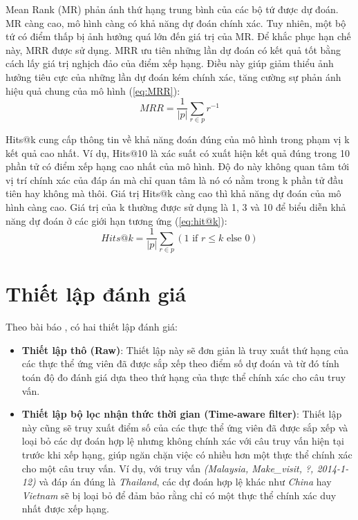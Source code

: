 Mean Rank (MR) phản ánh thứ hạng trung bình của các bộ tứ được dự đoán. MR càng cao, mô hình càng có khả năng dự đoán chính xác. Tuy
nhiên, một bộ tứ có điểm thấp bị ảnh hưởng quá lớn đến giá trị của MR. Để khắc phục hạn chế này, MRR được sử dụng. MRR ưu tiên những lần 
dự đoán có kết quả tốt bằng cách lấy giá trị nghịch đảo của điểm xếp hạng. Điều này giúp giảm thiểu ảnh hưởng tiêu cực của những lần dự đoán kém 
chính xác, tăng cường sự phản ánh hiệu quả chung của mô hình (\ref{eq:MRR}):
\begin{equation}
    \label{eq:MRR}
    MRR = \frac{1}{|p|} \sum_{r \in p} r^{-1}
\end{equation}

Hits@k cung cấp thông tin về khả năng đoán đúng của mô hình trong phạm vị k kết quả cao nhất. Ví dụ, Hits@10 là xác suất có xuất hiện kết quả đúng trong 10 phần tử có điểm xếp hạng cao nhất của mô hình. Độ đo này không quan tâm tới vị trí chính xác của đáp án mà chỉ quan tâm là nó có nằm trong k phần tử đầu tiên hay không mà thôi. Giá trị Hits@k càng cao thì khả năng dự đoán của mô hình càng cao. Giá trị của k thường được sử dụng là 1, 3 và 10 để biểu diễn khả năng dự đoán ở các giới hạn tương ứng (\ref{eq:hit@k}):
\begin{equation}
    \label{eq:hit@k}
    Hits@k = \frac{1}{|p|} \sum_{r \in p} (1 \text{ if } r \leq k \text{ else } 0)
\end{equation}

\section{Thiết lập đánh giá}

Theo bài báo \cite{ref_article45}, có hai thiết lập đánh giá:
\begin{itemize}
    \item \textbf{Thiết lập thô (Raw)}: Thiết lập này sẽ đơn giản là truy xuất thứ hạng của các thực thể ứng viên đã được sắp xếp theo điểm số
    dự đoán và từ đó tính toán độ đo đánh giá dựa theo thứ hạng của thực thể chính xác cho câu truy vấn. 
    \item \textbf{Thiết lập bộ lọc nhận thức thời gian (Time-aware filter)}: Thiết lập này cũng sẽ truy xuất điểm số của các thực thể ứng viên đã được sắp xếp 
    và loại bỏ các dự đoán hợp lệ nhưng không chính xác với câu truy vấn hiện tại trước khi xếp hạng, giúp ngăn chặn việc có nhiều hơn một thực thể chính xác cho một câu truy vấn.
    Ví dụ, với truy vấn \textit{(Malaysia, Make\_visit, ?, 2014-1-12)} và đáp án đúng là \textit{Thailand}, các dự đoán hợp lệ khác như 
    \textit{China} hay \textit{Vietnam} sẽ bị loại bỏ để đảm bảo rằng chỉ có một thực thể chính xác duy nhất được xếp hạng.
\end{itemize}


